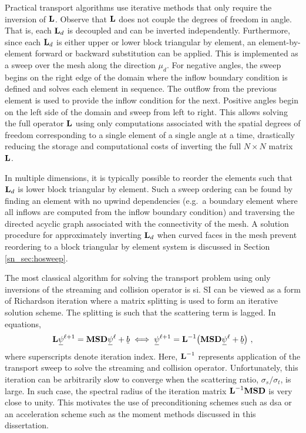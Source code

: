 \documentclass[../doc.tex]{subfiles}
\begin{document}
Practical transport algorithms use iterative methods that only require the inversion of $\boldsymbol{\mathrm{L}}$. Observe that $\boldsymbol{\mathrm{L}}$ does not couple the degrees of freedom in angle. That is, each $\boldsymbol{\mathrm{L}}_d$ is decoupled and can be inverted independently. Furthermore, since each $\boldsymbol{\mathrm{L}}_d$ is either upper or lower block triangular by element, an element-by-element forward or backward substitution can be applied. This is implemented as a sweep over the mesh along the direction $\mu_d$. For negative angles, the sweep begins on the right edge of the domain where the inflow boundary condition is defined and solves each element in sequence. The outflow from the previous element is used to provide the inflow condition for the next. Positive angles begin on the left side of the domain and sweep from left to right. This allows solving the full operator $\boldsymbol{\mathrm{L}}$ using only computations associated with the spatial degrees of freedom corresponding to a single element of a single angle at a time, drastically reducing the storage and computational costs of inverting the full $N\times N$ matrix $\boldsymbol{\mathrm{L}}$. 

In multiple dimensions, it is typically possible to reorder the elements such that $\boldsymbol{\mathrm{L}}_d$ is lower block triangular by element. Such a sweep ordering can be found by finding an element with no upwind dependencies (e.g.~a boundary element where all inflows are computed from the inflow boundary condition) and traversing the directed acyclic graph associated with the connectivity of the mesh. A solution procedure for approximately inverting $\boldsymbol{\mathrm{L}}_d$ when curved faces in the mesh prevent reordering to a block triangular by element system is discussed in Section \ref{sn_sec:hosweep}.  

The most classical algorithm for solving the transport problem using only inversions of the streaming and collision operator is \gls{si}. SI can be viewed as a form of Richardson iteration where a matrix splitting is used to form an iterative solution scheme. The splitting is such that the scattering term is lagged. In equations, 
	\begin{equation} \label{sn:sourceiteration}
		\mat{L}\ubar{\psi}^{\ell+1} = \mat{M}\mat{S}\mat{D}\ubar{\psi}^\ell + \ubar{b} \iff \ubar{\psi}^{\ell+1} = \mat{L}^{-1}\!\paren{\mat{M}\mat{S}\mat{D}\ubar{\psi}^\ell + \ubar{b}} \,, 
	\end{equation}
where superscripts denote iteration index. Here, $\boldsymbol{\mathrm{L}}^{-1}$ represents application of the transport sweep to solve the streaming and collision operator. Unfortunately, this iteration can be arbitrarily slow to converge when the scattering ratio, $\sigma_s/\sigma_t$, is large. In such case, the spectral radius of the iteration matrix $\boldsymbol{\mathrm{L}}^{-1}\boldsymbol{\mathrm{M}}\boldsymbol{\mathrm{S}}\boldsymbol{\mathrm{D}}$ is very close to unity. This motivates the use of preconditioning schemes such as \gls{dsa} or an acceleration scheme such as the moment methods discussed in this dissertation. 
\end{document}
